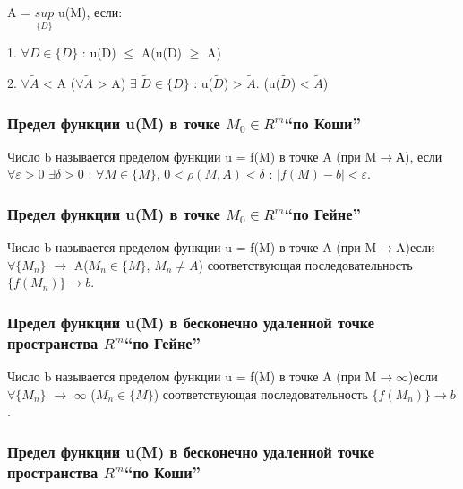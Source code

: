 \documentclass[a4paper, 12pt]{article}
\renewcommand{\epsilon}{\varepsilon}
\newcommand{\Rm}{\texorpdfstring{$R^m$}{Lg}}
\def\newline{}%
\def\quad{}%
\begin{document}
            A = $\underset{\{D\}}{sup}$ u(M), если:

            1. $\forall D \in \{D\}$ : u(D) $\leq$ A\quad (u(D) $\geq$ A)
            
            2. $\forall \widetilde{A}$ < A \quad ($\forall \widetilde{A}$ > A) $\exists$ $\widetilde{D}\in\{D\}$ : u($\widetilde{D}$) > $\widetilde{A}$.\quad
            (u($\widetilde{D}$) < $\widetilde{A}$)

            \subsubsection{Предел функции u(M) в точке \texorpdfstring{$M_0 \in R^m$}{Lg}\quad “по Коши”}

            Число b называется пределом функции u = f(M) в точке A (при M$\rightarrow$А), если
            $\forall \epsilon > 0$ $\exists \delta > 0$ : $\forall M \in \{M\}$, $0 < \rho(M, A) < \delta$ :
            $|f(M) - b| < \epsilon$.

            \subsubsection{Предел функции u(M) в точке \texorpdfstring{$M_0 \in R^m$}{Lg}\quad “по Гейне”}

            Число b называется пределом функции u = f(M) в точке A (при M$\rightarrow$A)\newline если $\forall \{M_n\}$
            $\rightarrow$ A($M_n \in \{M\}$, $M_n \neq A$) соответствующая последовательность\newline $\{f(M_n)\} \rightarrow b$.

            \subsubsection{Предел функции u(M) в бесконечно удаленной точке пространства \Rm \quad “по Гейне”}

            Число b называется пределом функции u = f(M) в точке A (при M$\rightarrow \infty$)\newline если $\forall \{M_n\}$
            $\rightarrow$ $\infty$ ($M_n \in \{M\}$) соответствующая последовательность $\{f(M_n)\} \rightarrow b$.

            \subsubsection{Предел функции u(M) в бесконечно удаленной точке пространства \Rm \quad “по Коши”}
\end{document}
